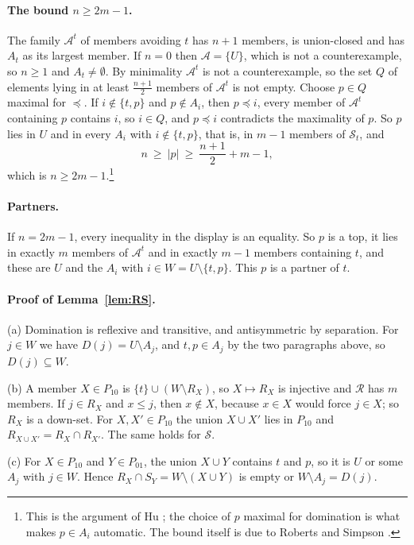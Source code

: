 \documentclass[12pt]{article}
\theoremstyle{plain}
\newcommand{\cA}{\mathcal{A}}
\begin{document}
\paragraph*{The bound $n\ge2m-1$.} The family $\cA^t$ of members avoiding $t$ has $n+1$ members, is union-closed and has $A_t$ as its largest member. If $n=0$ then $\cA=\{U\}$, which is not a counterexample, so $n\ge1$ and $A_t\ne\emptyset$. By minimality $\cA^t$ is not a counterexample, so the set $Q$ of elements lying in at least $\frac{n+1}{2}$ members of $\cA^t$ is not empty. Choose $p\in Q$ maximal for $\preceq$. If $i\notin\{t,p\}$ and $p\notin A_i$, then $p\preceq i$, every member of $\cA^t$ containing $p$ contains $i$, so $i\in Q$, and $p\preceq i$ contradicts the maximality of $p$. So $p$ lies in $U$ and in every $A_i$ with $i\notin\{t,p\}$, that is, in $m-1$ members of $\mathcal S_t$, and
\[
n\ \ge\ |p|\ \ge\ \frac{n+1}{2}+m-1,
\]
which is $n\ge 2m-1$.\footnote{This is the argument of Hu \cite{Hu17}; the choice of $p$ maximal for domination is what makes $p\in A_i$ automatic. The bound itself is due to Roberts and Simpson \cite{RS10}.}

\paragraph*{Partners.} If $n=2m-1$, every inequality in the display is an equality. So $p$ is a top, it lies in exactly $m$ members of $\cA^t$ and in exactly $m-1$ members containing $t$, and these are $U$ and the $A_i$ with $i\in W=U\setminus\{t,p\}$. This $p$ is a partner of $t$.

\paragraph*{Proof of Lemma~\ref{lem:RS}.} (a) Domination is reflexive and transitive, and antisymmetric by separation. For $j\in W$ we have $D(j)=U\setminus A_j$, and $t,p\in A_j$ by the two paragraphs above, so $D(j)\subseteq W$.

(b) A member $X\in P_{10}$ is $\{t\}\cup(W\setminus R_X)$, so $X\mapsto R_X$ is injective and $\mathcal R$ has $m$ members. If $j\in R_X$ and $x\le j$, then $x\notin X$, because $x\in X$ would force $j\in X$; so $R_X$ is a down-set. For $X,X'\in P_{10}$ the union $X\cup X'$ lies in $P_{10}$ and $R_{X\cup X'}=R_X\cap R_{X'}$. The same holds for $\mathcal S$.

(c) For $X\in P_{10}$ and $Y\in P_{01}$, the union $X\cup Y$ contains $t$ and $p$, so it is $U$ or some $A_j$ with $j\in W$. Hence $R_X\cap S_Y=W\setminus(X\cup Y)$ is empty or $W\setminus A_j=D(j)$.
\end{document}
